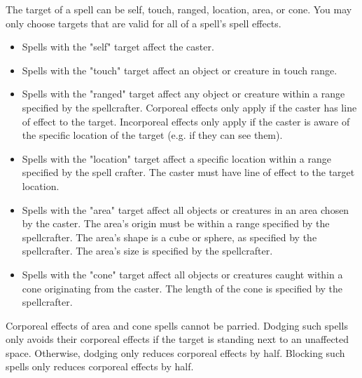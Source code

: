 \begin{multicols*}{2}
    The target of a spell can be self, touch, ranged, location, area, or cone.
    You may only choose targets that are valid for all of a spell's spell
    effects.
    \begin{itemize}
        \item Spells with the "self" target affect the caster.
        \item Spells with the "touch" target affect an object or creature in
            touch range.
        \item Spells with the "ranged" target affect any object or creature
            within a range specified by the spellcrafter.
            Corporeal effects only apply if the caster has line of effect
            to the target. Incorporeal effects only apply if the caster is
            aware of the specific location of the target (e.g. if they can see
            them).
        \item Spells with the "location" target affect a specific location
            within a range specified by the spell crafter. The caster must have
            line of effect to the target location.
        \item Spells with the "area" target affect all objects or creatures
            in an area chosen by the caster. The area's origin must be within
            a range specified by the spellcrafter. The area's shape is a cube
            or sphere, as specified by the spellcrafter. The area's size is
            specified by the spellcrafter.
        \item Spells with the "cone" target affect all objects or creatures
            caught within a cone originating from the caster. The length of
            the cone is specified by the spellcrafter.
    \end{itemize}

    Corporeal effects of area and cone spells cannot be parried. Dodging such
    spells only avoids their corporeal effects if the target is standing next
    to an unaffected space. Otherwise, dodging only reduces corporeal effects
    by half. Blocking such spells only reduces corporeal effects by half.


\end{multicols*}

